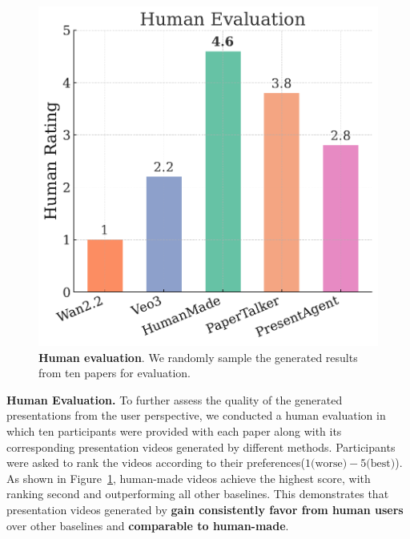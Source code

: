 \begin{figure} %
  \vspace{-0.8\baselineskip}              %
  \centering
  \small
  \includegraphics[width=\linewidth]{figure/human_evaluation_bar.pdf}
  \captionsetup{skip=0pt}                 %
  \caption{\small \textbf{Human evaluation}. We randomly sample the generated results from ten papers for evaluation.}
  \label{fig:human_eval}
\end{figure}
\vspace{-0.3\baselineskip} 
\textbf{Human Evaluation.}
To further assess the quality of the generated presentations from the user perspective, we conducted a human evaluation in which ten participants were provided with each paper along with its corresponding presentation videos generated by different methods. Participants were asked to rank the videos according to their preferences($1\text{(worse)}-5\text{(best)}$).
As shown in Figure~\ref{fig:human_eval}, human-made videos achieve the highest score, with {\agent} ranking second and outperforming all other baselines. This demonstrates that presentation videos generated by {\agent} \textbf{gain consistently favor from human users} over other baselines and \textbf{comparable to human-made}.

